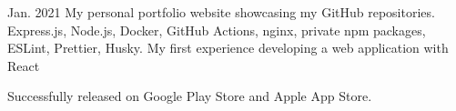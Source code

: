 

\begin{cvprojects}
  \item {}
  {Jan. 2021}
  {My personal
    portfolio website showcasing my GitHub repositories.}
  {Express.js, Node.js, Docker, GitHub Actions, nginx, private npm packages, ESLint, Prettier, Husky.}
  {My first experience developing a web application with React}
  {
    \begin{cvitems}
      \item {Successfully released on Google Play Store and Apple App Store.}
    \end{cvitems} }

\end{cvprojects}